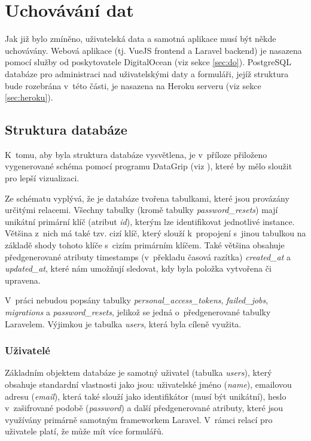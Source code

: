 \section{Uchovávání dat}
Jak již bylo zmíněno, uživatelská data a samotná aplikace musí být někde uchovávány. Webová aplikace (tj. VueJS frontend a Laravel backend) je nasazena pomocí služby  od poskytovatele DigitalOcean (viz sekce \ref{sec:do}). PostgreSQL databáze pro administraci nad uživatelskými daty a formuláři, jejíž struktura bude rozebrána v~této části, je nasazena na Heroku serveru (viz sekce \ref{sec:heroku}). 

	\subsection{Struktura databáze}
	K~tomu, aby byla struktura databáze vysvětlena, je v~příloze přiloženo vygenerované schéma pomocí programu DataGrip (viz ), které by mělo sloužit pro lepší vizualizaci. 
	
	Ze schématu vyplývá, že je databáze tvořena tabulkami, které jsou provázány určitými relacemi. Všechny tabulky (kromě tabulky \textit{password\_resets}) mají unikátní primární klíč (atribut \textit{id}), kterým lze identifikovat jednotlivé instance. Většina z~nich má také tzv. cizí klíč, který slouží k~propojení s~jinou tabulkou na základě shody tohoto klíče s~cizím primárním klíčem. Také většina obsahuje předgenerované atributy timestamps (v~překladu časová razítka) \textit{created\_at} a \textit{updated\_at}, které nám umožňují sledovat, kdy byla položka vytvořena či upravena.
	
	V~práci nebudou popsány tabulky \textit{personal\_access\_tokens}, \textit{failed\_jobs}, \textit{migrations} a \textit{pass\-word\_resets}, jelikož se jedná o~předgenerované tabulky Laravelem. Výjimkou je tabulka \textit{users}, která byla cíleně využita.
	
	\subsubsection{Uživatelé}
	Základním objektem databáze je samotný uživatel (tabulka \textit{users}), který obsahuje standardní vlastnosti jako jsou: uživatelské jméno (\textit{name}), emailovou adresu (\textit{email}), která také slouží jako identifikátor (musí být unikátní), heslo v~zašifrované podobě (\textit{password}) a další předgenerované atributy, které jsou využívány primárně samotným frameworkem Laravel. V~rámci relací pro uživatele platí, že může mít více formulářů.
	
